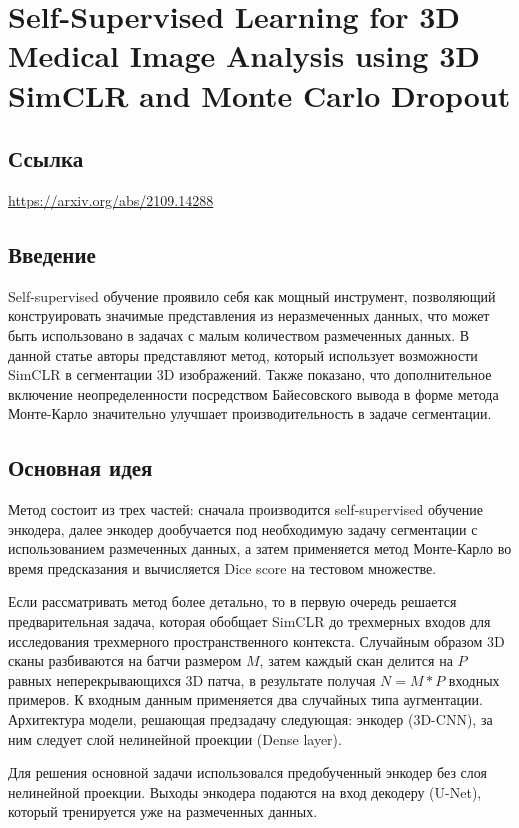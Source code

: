 \section{Self-Supervised Learning for 3D Medical Image Analysis using
3D SimCLR and Monte Carlo Dropout}

\subsection*{Ссылка} \url{https://arxiv.org/abs/2109.14288}
\subsection*{Введение} 
Self-supervised обучение проявило себя как мощный инструмент,
позволяющий конструировать значимые представления из неразмеченных
данных, что может быть использовано в задачах с малым количеством 
размеченных данных. В данной статье авторы представляют метод, 
который использует возможности SimCLR в сегментации 3D изображений.
Также показано, что дополнительное включение неопределенности 
посредством Байесовского вывода в форме метода Монте-Карло
значительно улучшает производительность в задаче сегментации.

\subsection*{Основная идея}
Метод состоит из трех частей: сначала производится self-supervised 
обучение энкодера, далее энкодер дообучается под необходимую 
задачу сегментации с использованием размеченных данных, а затем 
применяется метод Монте-Карло во время предсказания и вычисляется 
Dice score на тестовом множестве. \par
Если рассматривать метод более детально, то в первую очередь 
решается предварительная задача, которая обобщает SimCLR до 
трехмерных входов для исследования трехмерного пространственного контекста.
Случайным образом 3D сканы разбиваются на батчи размером \(M\), затем каждый скан 
делится на \(P\) равных неперекрывающихся 3D патча, в результате получая \(N=M*P\)
входных примеров. К входным данным применяется два случайных типа аугментации.
Архитектура модели, решающая предзадачу следующая: энкодер (3D-CNN), за ним следует 
слой нелинейной проекции (Dense layer). \par
Для решения основной задачи использовался предобученный энкодер без слоя нелинейной 
проекции. Выходы энкодера подаются на вход декодеру (U-Net), который тренируется 
уже на размеченных данных.
